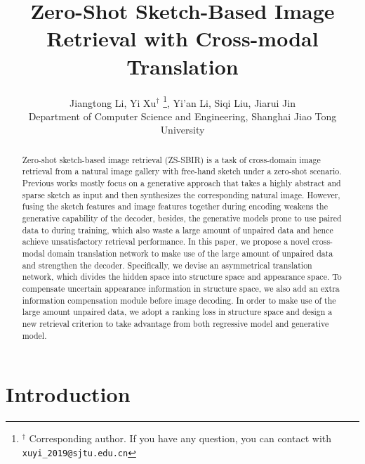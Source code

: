 \documentclass[10pt,twocolumn,letterpaper]{article}
\begin{document}
\title{Zero-Shot Sketch-Based Image Retrieval with Cross-modal Translation}

\author{Jiangtong Li, Yi Xu$^{\dag}$ \thanks{$^{\dag}$ Corresponding author. If you have any question, you can contact with \tt{xuyi\_2019@sjtu.edu.cn}},  Yi'an Li, Siqi Liu, Jiarui Jin  \\
Department of Computer Science and Engineering, Shanghai Jiao Tong University \\
}



\maketitle

\begin{abstract}
   Zero-shot sketch-based image retrieval (ZS-SBIR) is a task of cross-domain image retrieval from a natural image gallery with free-hand sketch under a zero-shot scenario. 
   Previous works mostly focus on a generative approach that takes a highly abstract and sparse sketch as input and then synthesizes the corresponding natural image. 
   However, fusing the sketch features and image features together during encoding weakens the generative capability of the decoder, besides, the generative models prone to use paired data to during training, which also waste a large amount of unpaired data and hence achieve unsatisfactory retrieval performance. 
   In this paper, we propose a novel cross-modal domain translation network to make use of the large amount of unpaired data and strengthen the decoder. 
   Specifically, we devise an asymmetrical translation network, which divides the hidden space into structure space and appearance space. To compensate uncertain appearance information in structure space, we also add an extra information compensation module before image decoding.
   In order to make use of the large amount unpaired data, we adopt a ranking loss in structure space and design a new retrieval criterion to take advantage from both regressive model and generative model.
\end{abstract}

\section{Introduction}
\end{document}
